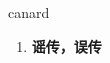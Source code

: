
\begin{frame}
{\huge canard}
\begin{center}
\begin{enumerate}\Large
  \item \textbf{谣传，误传}
\end{enumerate}
\end{center}
\end{frame}
